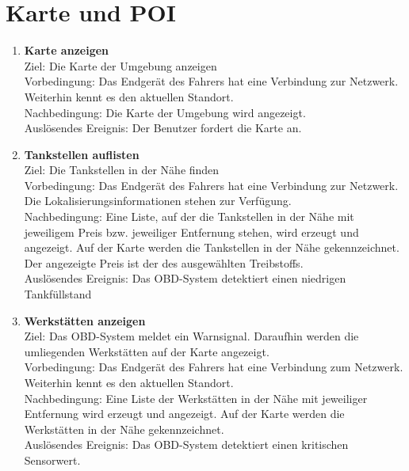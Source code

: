 \documentclass[pflichtenheft.tex]{subfiles}
\begin{document}
	
	\section{Karte und POI}
	
	\begin{enumerate}
	\setcounter{enumi}{\value{enumTemp}}
	\item{\textbf{Karte anzeigen}}
		\\Ziel: Die Karte der Umgebung anzeigen
		\\Vorbedingung: Das Endgerät des Fahrers hat eine Verbindung zur Netzwerk. Weiterhin kennt es den aktuellen Standort.
		\\Nachbedingung: Die Karte der Umgebung wird angezeigt.
  	 	\\Auslösendes Ereignis: Der Benutzer fordert die Karte an.
  	\item {\textbf{Tankstellen auflisten}}
		\\Ziel: Die Tankstellen in der Nähe finden
		\\Vorbedingung: Das Endgerät des Fahrers hat eine Verbindung zur Netzwerk.
		Die Lokalisierungsinformationen stehen zur Verfügung.
		\\Nachbedingung: Eine Liste, auf der die Tankstellen in der Nähe mit
		jeweiligem Preis bzw. jeweiliger Entfernung stehen, wird erzeugt und angezeigt. Auf der
		Karte werden die Tankstellen in der Nähe gekennzeichnet. 
		Der angezeigte Preis ist der des ausgewählten Treibstoffs.
		\\Auslösendes Ereignis: Das OBD-System detektiert einen niedrigen Tankfüllstand
  	
	\item{\textbf{Werkstätten anzeigen}} 
		\\Ziel: Das OBD-System meldet ein Warnsignal. Daraufhin werden die umliegenden Werkstätten auf der Karte angezeigt.
		\\Vorbedingung: Das Endgerät des Fahrers hat eine Verbindung zum Netzwerk. Weiterhin kennt es den aktuellen Standort.
		\\Nachbedingung: Eine Liste der Werkstätten in der Nähe mit jeweiliger Entfernung wird erzeugt und angezeigt. Auf der Karte werden die Werkstätten in der Nähe gekennzeichnet. 
	 	\\Auslösendes Ereignis: Das OBD-System detektiert einen kritischen Sensorwert.
  	
  		\renewcommand{\theenumi}{/FA\ifnum \value{enumi}<10 0\fi\arabic{enumi}0W/}
		\renewcommand{\labelenumi}{\theenumi}
		\renewcommand{\theenumii}{\arabic{enumii}}
		\renewcommand{\labelenumii}{/FA\ifnum \value{enumi}<10 0\fi\arabic{enumi}\arabic{enumii}W/}


\end{enumerate}
\end{document}
